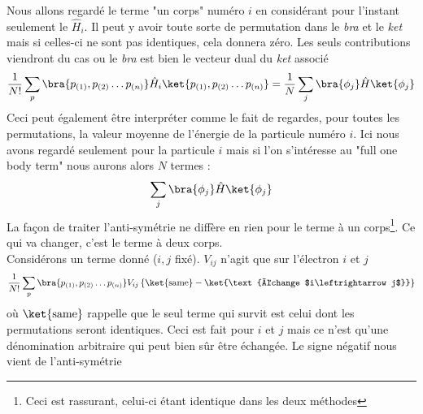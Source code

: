 Nous allons regardé le terme "un corps" numéro $i$ en considérant pour l'instant seulement le $\hat{H}_i$. Il peut y 
avoir toute sorte de permutation dans le \textit{bra} et le \textit{ket} mais si celles-ci ne sont pas identiques, 
cela donnera zéro. Les seuls contributions viendront du cas ou le \textit{bra} est bien le vecteur dual du 
\textit{ket} associé
\begin{equation}
\frac{1}{N!}\sum_p \bra{p_{(1)},p_{(2)}\dots p_{(n)}}\hat{H}_i\ket{p_{(1)},p_{(2)}\dots p_{(n)}} = \frac{1}{N}
\sum_j\bra{\phi_j}\hat{H}\ket{\phi_j}
\end{equation}
Ceci peut également être interpréter comme le fait de regardes, pour toutes les permutations, la valeur moyenne 
de l'énergie de la particule numéro $i$. Ici nous avons regardé seulement pour la particule $i$ mais si l'on 
s'intéresse au "full one body term" nous aurons alors $N$ termes :
\begin{equation}
\sum_j\bra{\phi_j}\hat{H}\ket{\phi_j}
\end{equation}
La façon de traiter l'anti-symétrie ne diffère en rien pour le terme à un corps\footnote{Ceci est rassurant, 
celui-ci étant identique dans les deux méthodes}. Ce qui va changer, c'est le terme à deux corps.\\

Considérons un terme donné ($i,j$ fixé). $V_{ij}$ n'agit que sur l'électron $i$ et $j$
\begin{equation}
\frac{1}{N!}\sum_p \bra{p_{(1)},p_{(2)}\dots p_{(n)}} V_{ij} \left\{\ket{\text{same}} - \ket{\text{échange $i\leftrightarrow j$}}\right\}
\end{equation}
où $\ket{\text{same}}$ rappelle que le seul terme qui survit est celui dont les permutations seront identiques. Ceci 
est fait pour $i$ et $j$ mais ce n'est qu'une dénomination arbitraire qui peut bien sûr être échangée. Le signe 
négatif nous vient de l'anti-symétrie

\newpage
